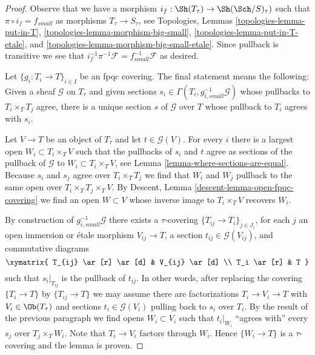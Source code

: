 \begin{proof}
Observe that we have a morphism $i_f : \Sh(T_\tau) \to \Sh(\Sch/S)_\tau)$
such that $\pi \circ i_f = f_{small}$ as morphisms
$T_\tau \to S_\tau$, see
Topologies, Lemmas \ref{topologies-lemma-put-in-T},
\ref{topologies-lemma-morphism-big-small},
\ref{topologies-lemma-put-in-T-etale}, and
\ref{topologies-lemma-morphism-big-small-etale}.
Since pullback is transitive we see that
$i_f^{-1} \pi^{-1}\mathcal{F} = f_{small}^{-1}\mathcal{F}$ as desired.

\medskip\noindent
Let $\{g_i : T_i \to T\}_{i \in I}$ be an fpqc covering.
The final statement means the following: Given a sheaf $\mathcal{G}$
on $T_\tau$ and given sections
$s_i \in \Gamma(T_i, g_{i, small}^{-1}\mathcal{G})$ whose pullbacks
to $T_i \times_T T_j$ agree, there is a unique section $s$ of $\mathcal{G}$
over $T$ whose pullback to $T_i$ agrees with $s_i$.

\medskip\noindent
Let $V \to T$ be an object of $T_\tau$ and let $t \in \mathcal{G}(V)$.
For every $i$ there is a largest open $W_i \subset T_i \times_T V$
such that the pullbacks of $s_i$ and $t$ agree as sections of the pullback
of $\mathcal{G}$ to $W_i \subset T_i \times_T V$, see
Lemma \ref{lemma-where-sections-are-equal}.
Because $s_i$ and $s_j$ agree over $T_i \times_T T_j$ we find
that $W_i$ and $W_j$ pullback to the same open over
$T_i \times_T T_j \times_T V$. By
Descent, Lemma \ref{descent-lemma-open-fpqc-covering}
we find an open $W \subset V$ whose inverse image to $T_i \times_T V$
recovers $W_i$. 

\medskip\noindent
By construction of $g_{i, small}^{-1}\mathcal{G}$ there exists
a $\tau$-covering $\{T_{ij} \to T_i\}_{j \in J_i}$, for each $j$ an
open immersion or \'etale morphism $V_{ij} \to T$, a section
$t_{ij} \in \mathcal{G}(V_{ij})$, and commutative diagrams
$$
\xymatrix{
T_{ij} \ar[r] \ar[d] & V_{ij} \ar[d] \\
T_i \ar[r] & T
}
$$
such that $s_i|_{T_{ij}}$ is the pullback of $t_{ij}$. In other words,
after replacing the covering $\{T_i \to T\}$ by $\{T_{ij} \to T\}$
we may assume there are factorizations $T_i \to V_i \to T$ with
$V_i \in \Ob(T_\tau)$ and sections $t_i \in \mathcal{G}(V_i)$
pulling back to $s_i$ over $T_i$.
By the result of the previous paragraph we find opens $W_i \subset V_i$
such that $t_i|_{W_i}$ ``agrees with'' every $s_j$ over $T_j \times_T W_i$.
Note that $T_i \to V_i$ factors through $W_i$.
Hence $\{W_i \to T\}$ is a $\tau$-covering and the lemma is proven.
\end{proof}






